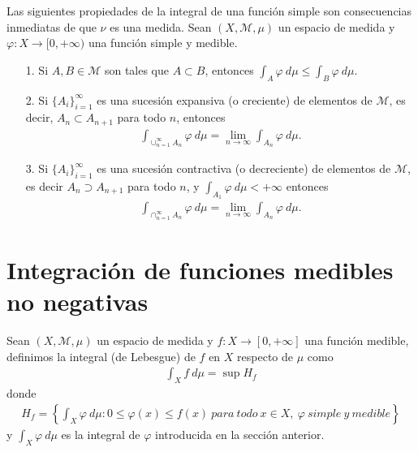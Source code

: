 Las siguientes propiedades de la integral de una función simple son consecuencias inmediatas de que $\nu$ es una medida. Sean $(X, \mathcal{M}, \mu)$ un espacio de medida y $\varphi: X \longrightarrow [0,+\infty)$ una función simple y medible.
\begin{enumerate}
    \item[1.] Si $A,B \in \mathcal{M}$ son tales que $A \subset B$, entonces $\int_{A}{\varphi \ d\mu} \leq \int_{B}{\varphi \ d\mu}$.
    \item[2.] Si $\{ A_i \}_{i=1}^{\infty}$ es una sucesión expansiva (o creciente) de elementos de $\mathcal{M}$, es decir, $A_n \subset A_{n+1}$ para todo $n$, entonces
          \begin{align*}
              \int_{\cup_{n=1}^{\infty}{A_n}}{\varphi \ d\mu} = \lim_{n \to \infty}{\int_{A_n}{\varphi \ d\mu}}.
          \end{align*}
    \item[3.] Si $\{ A_i \}_{i=1}^{\infty}$ es una sucesión contractiva (o decreciente) de elementos de $\mathcal{M}$, es decir $A_n \supset A_{n+1}$ para todo $n$, y $\int_{A_1}{\varphi \ d\mu} < +\infty$ entonces
          \begin{align*}
              \int_{\cap_{n=1}^{\infty}{A_n}}{\varphi \ d\mu} = \lim_{n \to \infty}{\int_{A_n}{\varphi \ d\mu}}.
          \end{align*}
\end{enumerate}

\section{Integración de funciones medibles no negativas}

\begin{defi}
    Sean $(X, \mathcal{M}, \mu)$ un espacio de medida y $f: X \longrightarrow [0,+\infty]$ una función medible, definimos la integral (de Lebesgue) de $f$ en $X$ respecto de $\mu$ como
    \begin{align*}
        \int_{X}{f \ d\mu} = \sup{H_f}
    \end{align*}
    donde
    \begin{align*}
        H_f = \left\{ \int_{X}{\varphi \ d\mu} : 0 \leq \varphi(x) \leq f(x) \ para \ todo \ x \in X, \ \varphi \ simple \ y \ medible \right\}
    \end{align*}
    y $\int_{X}{\varphi \ d\mu}$ es la integral de $\varphi$ introducida en la sección anterior.
\end{defi}

